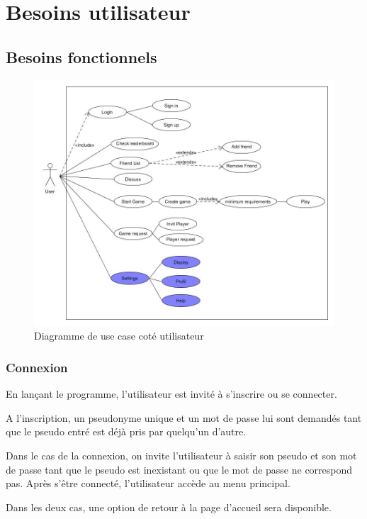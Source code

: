 \documentclass[a4paper,12pt]{article}
\begin{document}
\section{Besoins utilisateur}

\subsection{Besoins fonctionnels}


\begin{figure}[h!]
\centering
\includegraphics[width=15cm]{UserUseCase}
\caption{Diagramme de use case coté utilisateur}
\label{fig:UerUseCase}
\end{figure}

\subsubsection{Connexion}
En lançant le programme, l'utilisateur est invité à s'inscrire ou se connecter.

A l'inscription, un pseudonyme unique et un mot de passe lui sont demandés tant que le pseudo entré est déjà pris par quelqu'un d'autre.

Dans le cas de la connexion, on invite l'utilisateur à saisir son pseudo et son mot de passe tant que le pseudo est inexistant ou que le mot de passe ne correspond pas. Après s’être connecté, l'utilisateur accède au menu principal.

Dans les deux cas, une option de retour à la page d'accueil sera disponible.
\end{document}
